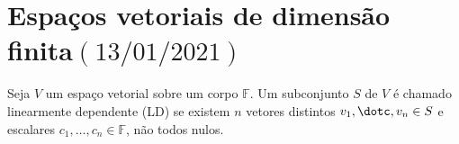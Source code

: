 \chapter{Espaços vetoriais de dimensão finita\quad$\left(13/01/2021\right)$}

\begin{definition}
  Seja $V$ um espaço vetorial sobre um corpo $\mathbb{F}$.
  Um subconjunto $S$ de $V$ é chamado linearmente dependente (LD)
  se existem $n$ vetores distintos $v_{1},\dotc,v_{n}\in S$ e
  escalares $c_{1},\dotsc,c_{n}\in\mathbb{F}$, não todos nulos.
\end{definition}